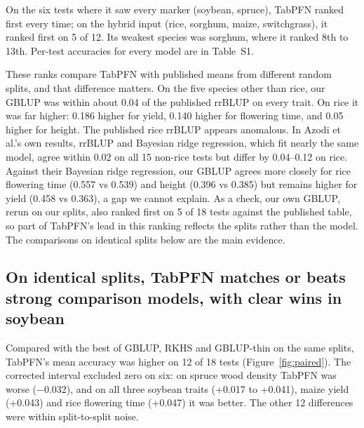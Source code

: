 \documentclass[11pt]{article}
\begin{document}
\begin{table}[tbp]
\centering
\caption{Rank of TabPFN-3.5 among the 18 published methods of \citet{azodi2019} (Table S5 of that paper), over the 18 species-trait tests. Only the seven methods with the best median ranks are shown.}
\label{tab:ranks}
\small

\end{table}

On the six tests where it saw every marker (soybean, spruce), TabPFN ranked first every time; on the hybrid input (rice, sorghum, maize, switchgrass), it ranked first on 5 of 12. Its weakest species was sorghum, where it ranked 8th to 13th. Per-test accuracies for every model are in Table~S1.

These ranks compare TabPFN with published means from different random splits, and that difference matters. On the five species other than rice, our GBLUP was within about 0.04 of the published rrBLUP on every trait. On rice it was far higher: 0.186 higher for yield, 0.140 higher for flowering time, and 0.05 higher for height. The published rice rrBLUP appears anomalous. In Azodi et al.'s own results, rrBLUP and Bayesian ridge regression, which fit nearly the same model, agree within 0.02 on all 15 non-rice tests but differ by 0.04--0.12 on rice. Against their Bayesian ridge regression, our GBLUP agrees more closely for rice flowering time (0.557 vs 0.539) and height (0.396 vs 0.385) but remains higher for yield (0.458 vs 0.363), a gap we cannot explain. As a check, our own GBLUP, rerun on our splits, also ranked first on 5 of 18 tests against the published table, so part of TabPFN's lead in this ranking reflects the splits rather than the model. The comparisons on identical splits below are the main evidence.

\subsection{On identical splits, TabPFN matches or beats strong comparison models, with clear wins in soybean}

Compared with the best of GBLUP, RKHS and GBLUP-thin on the same splits, TabPFN's mean accuracy was higher on 12 of 18 tests (Figure~\ref{fig:paired}). The corrected interval excluded zero on six: on spruce wood density TabPFN was worse (−0.032), and on all three soybean traits (+0.017 to +0.041), maize yield (+0.043) and rice flowering time (+0.047) it was better. The other 12 differences were within split-to-split noise.
\end{document}
